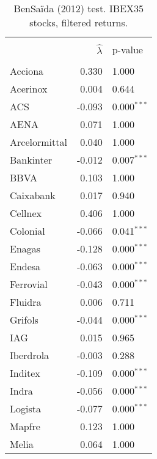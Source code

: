 \documentclass[12pt]{article}
\begin{document}
\begin{table}  [H]\small
    \caption{ BenSa\"{i}da (2012) test. IBEX35 stocks, filtered returns.}
     \begin{tabular*}{\textwidth}{@{\extracolsep{\fill}}lrl}
        \hline &  &  \\ 
        
                  & $\hat{\lambda}$ &  p-value \\
        \hline &  &  \\ 
        Acciona                 &  0.330 & 1.000 \\ 
        Acerinox                &  0.004 & 0.644  \\ 
        ACS                     & -0.093 & 0.000$^{***}$ \\ 
				AENA                    &  0.071 & 1.000 \\ 
        Arcelormittal           &  0.040 & 1.000 \\ 
  			Bankinter               & -0.012 & 0.007$^{***}$ \\ 
        BBVA                    &  0.103 & 1.000  \\ 
        Caixabank               &  0.017 & 0.940   \\ 
        Cellnex                 &  0.406 & 1.000 \\ 
        Colonial                & -0.066 & 0.041$^{***}$ \\ 
        Enagas                  & -0.128 & 0.000$^{***}$ \\ 
        Endesa                  & -0.063 & 0.000$^{***}$  \\ 
        Ferrovial               & -0.043 & 0.000$^{***}$  \\ 
        Fluidra                 & 0.006  & 0.711  \\ 
        Grifols                 & -0.044 & 0.000$^{***}$  \\ 
        IAG                     &  0.015 & 0.965  \\ 
        Iberdrola               & -0.003 & 0.288  \\ 
        Inditex                 & -0.109 & 0.000$^{***}$  \\ 
        Indra                   & -0.056 & 0.000$^{***}$   \\ 
        Logista                 & -0.077 & 0.000$^{***}$ \\ 
        Mapfre                  &  0.123 & 1.000 \\ 
        Melia                   &  0.064 & 1.000 \\ 

\end{tabular*}
\end{table}
\end{document}
